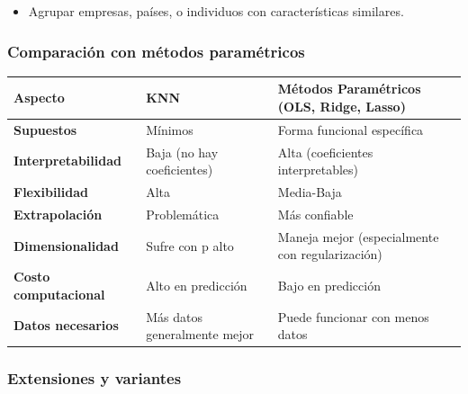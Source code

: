 \documentclass[
  doc,
  floatsintext,
  longtable,
  a4paper,
  nolmodern,
  notxfonts,
  notimes,
  12pt,
  colorlinks=true,linkcolor=blue,citecolor=blue,urlcolor=blue]{apa7}
\providecommand{\tightlist}{%
  \setlength{\itemsep}{0pt}\setlength{\parskip}{0pt}}
\newcounter{none} %
\begin{document}
\begin{itemize}
\tightlist
\item
  Agrupar empresas, países, o individuos con características similares.
\end{itemize}

\subsubsection{Comparación con métodos
paramétricos}\label{comparaciuxf3n-con-muxe9todos-paramuxe9tricos}

{\def\LTcaptype{none} %
\begin{longtable}[]{@{}
  >{\raggedright\arraybackslash}p{}
  >{\raggedright\arraybackslash}p{}
  >{\raggedright\arraybackslash}p{}@{}}
\toprule\noalign{}
\begin{minipage}[b]{\linewidth}\raggedright
Aspecto
\end{minipage} & \begin{minipage}[b]{\linewidth}\raggedright
KNN
\end{minipage} & \begin{minipage}[b]{\linewidth}\raggedright
Métodos Paramétricos (OLS, Ridge, Lasso)
\end{minipage} \\
\midrule\noalign{}
\endhead
\bottomrule\noalign{}
\endlastfoot
\textbf{Supuestos} & Mínimos & Forma funcional específica \\
\textbf{Interpretabilidad} & Baja (no hay coeficientes) & Alta
(coeficientes interpretables) \\
\textbf{Flexibilidad} & Alta & Media-Baja \\
\textbf{Extrapolación} & Problemática & Más confiable \\
\textbf{Dimensionalidad} & Sufre con p alto & Maneja mejor
(especialmente con regularización) \\
\textbf{Costo computacional} & Alto en predicción & Bajo en
predicción \\
\textbf{Datos necesarios} & Más datos generalmente mejor & Puede
funcionar con menos datos \\
\end{longtable}
}

\subsubsection{Extensiones y variantes}\label{extensiones-y-variantes-1}
\end{document}
